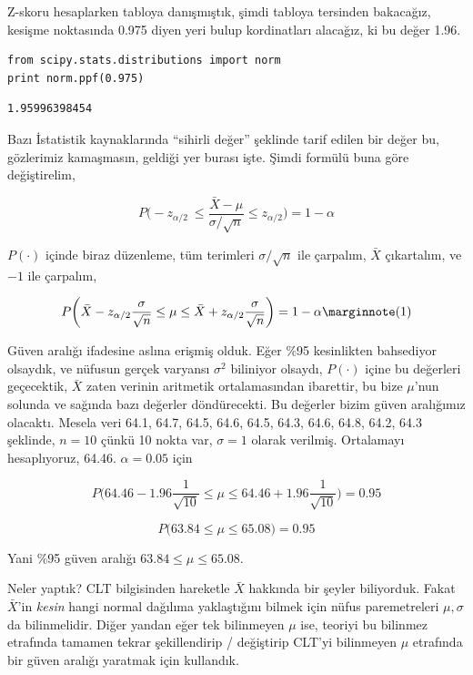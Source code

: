 \documentclass[12pt,fleqn]{article}\usepackage{../../common}
\begin{document}
Z-skoru hesaplarken tabloya danışmıştık, şimdi tabloya tersinden bakacağız,
kesişme noktasında 0.975 diyen yeri bulup kordinatları alacağız, ki bu
değer 1.96. 

\begin{verbatim}
from scipy.stats.distributions import norm
print norm.ppf(0.975)
\end{verbatim}

\begin{verbatim}
1.95996398454
\end{verbatim}

Bazı İstatistik kaynaklarında ``sihirli değer'' şeklinde tarif edilen bir
değer bu, gözlerimiz kamaşmasın, geldiği yer burası işte. Şimdi formülü
buna göre değiştirelim,

$$ 
P \bigg( 
-z_{\alpha/2} \
\le \frac{\bar{X} - \mu}{\sigma / \sqrt{n}} 
\le z_{\alpha/2}
\bigg) = 1-\alpha
 $$

$P(\cdot)$ içinde biraz düzenleme, tüm terimleri $\sigma / \sqrt{n}$ ile
çarpalım, $\bar{X}$ çıkartalım, ve $-1$ ile çarpalım,

$$ 
P \bigg( 
\bar{X} - z_{\alpha/2}\frac{\sigma}{\sqrt{n}}
\le \mu
\le \bar{X} + z_{\alpha/2}\frac{\sigma}{\sqrt{n}}
\bigg) = 1-\alpha
\mlabel{1}
 $$

Güven aralığı ifadesine aslına erişmiş olduk. Eğer \%95 kesinlikten
bahsediyor olsaydık, ve nüfusun gerçek varyansı $\sigma^2$ biliniyor
olsaydı, $P(\cdot)$ içine bu değerleri geçecektik, $\bar{X}$ zaten verinin
aritmetik ortalamasından ibarettir, bu bize $\mu$'nun solunda ve sağında
bazı değerler döndürecekti. Bu değerler bizim güven aralığımız
olacaktı. Mesela veri 64.1, 64.7, 64.5, 64.6, 64.5, 64.3, 64.6, 64.8,
64.2, 64.3 şeklinde, $n=10$ çünkü 10 nokta var, $\sigma = 1$ olarak
verilmiş.  Ortalamayı hesaplıyoruz, 64.46. $\alpha=0.05$ için

$$ 
P \bigg( 
64.46 - 1.96\frac{1}{\sqrt{10}}
\le \mu
\le 64.46 + 1.96\frac{1}{\sqrt{10}}
\bigg) = 0.95
 $$

$$ P\bigg(63.84 \le \mu \le 65.08\bigg) = 0.95 $$

Yani \%95 güven aralığı $63.84 \le \mu \le 65.08$. 

Neler yaptık? CLT bilgisinden hareketle $\bar{X}$ hakkında bir şeyler
biliyorduk. Fakat $\bar{X}$'in {\em kesin} hangi normal dağılıma
yaklaştığını bilmek için nüfus paremetreleri $\mu,\sigma$ da
bilinmelidir. Diğer yandan eğer tek bilinmeyen $\mu$ ise, teoriyi bu
bilinmez etrafında tamamen tekrar şekillendirip / değiştirip CLT'yi
bilinmeyen $\mu$ etrafında bir güven aralığı yaratmak için kullandık.
\end{document}
